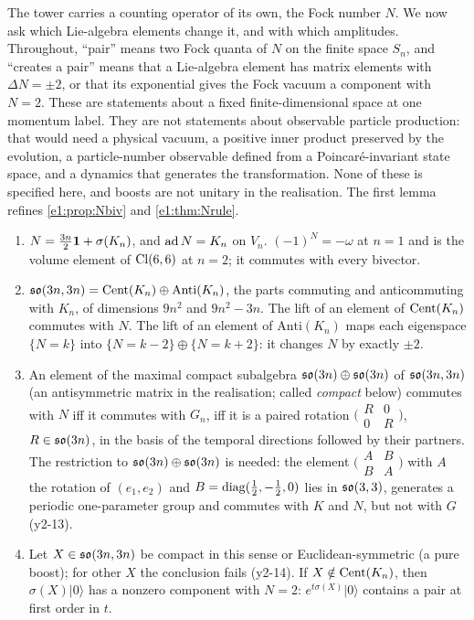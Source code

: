 The tower carries a counting operator of its own, the Fock number $N$. We now ask which Lie-algebra elements change it, and with which
amplitudes. Throughout, ``pair'' means two Fock quanta of $N$ on the finite space $S_n$, and ``creates a pair'' means that a Lie-algebra element
has matrix elements with $\Delta N=\pm2$, or that its exponential gives the Fock vacuum a component with $N=2$. These are statements about a
fixed finite-dimensional space at one momentum label. They are not statements about observable particle production: that would need a
physical vacuum, a positive inner product preserved by the evolution, a particle-number observable defined from a Poincar\'e-invariant
state space, and a dynamics that generates the transformation. None of these is specified here, and boosts are not unitary in the
realisation. The first lemma refines \cref{e1:prop:Nbiv} and \cref{e1:thm:Nrule}.

\begin{lemma}
\label{e2:lem:N}
\begin{enumerate}[label=(\roman*),leftmargin=2.2em]
\item $N=\tfrac{3n}2\mathbf 1+\sigma(K_n)$, and $\operatorname{ad} N=K_n$ on $V_n$. $(-1)^N=-\omega$ at $n=1$ and is the volume element of $\mathrm{Cl}(6,6)$ at $n=2$; it commutes with
every bivector.
\item $\mathfrak{so}(3n,3n)=\operatorname{Cent}(K_n)\oplus\mathrm{Anti}(K_n)$, the parts commuting and anticommuting with $K_n$, of dimensions $9n^2$ and $9n^2-3n$. The lift of an
element of $\operatorname{Cent}(K_n)$ commutes with $N$. The lift of an element of $\mathrm{Anti}(K_n)$ maps each eigenspace $\{N=k\}$ into $\{N=k-2\}\oplus\{N=k+2\}$:
it changes $N$ by exactly $\pm2$.
\item An element of the maximal compact subalgebra $\mathfrak{so}(3n)\oplus\mathfrak{so}(3n)$ of $\mathfrak{so}(3n,3n)$ (an antisymmetric matrix in the realisation; called
\emph{compact} below) commutes with $N$ iff it commutes with $G_n$, iff it is a paired rotation
$\bigl(\begin{smallmatrix}R&0\\0&R\end{smallmatrix}\bigr)$, $R\in\mathfrak{so}(3n)$, in the basis of the temporal directions followed by their partners. The
restriction to $\mathfrak{so}(3n)\oplus\mathfrak{so}(3n)$ is needed: the element $\bigl(\begin{smallmatrix}A&B\\B&A\end{smallmatrix}\bigr)$ with $A$ the rotation of
$(e_1,e_2)$ and $B=\operatorname{diag}(\tfrac12,-\tfrac12,0)$ lies in $\mathfrak{so}(3,3)$, generates a periodic one-parameter group and commutes with $K$ and $N$, but
not with $G$ (y2-13).
\item Let $X\in\mathfrak{so}(3n,3n)$ be compact in this sense or Euclidean-symmetric (a pure boost); for other $X$ the conclusion fails (y2-14). If $X\notin\operatorname{Cent}(K_n)$, then $\sigma(X)|0\rangle$ has a nonzero
component with $N=2$: $e^{t\sigma(X)}|0\rangle$ contains a pair at first order in $t$.
\end{enumerate}
\end{lemma}

